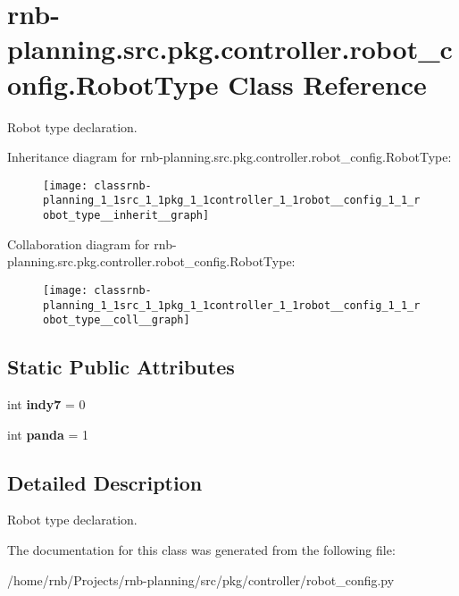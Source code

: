 \hypertarget{classrnb-planning_1_1src_1_1pkg_1_1controller_1_1robot__config_1_1_robot_type}{}\section{rnb-\/planning.src.\+pkg.\+controller.\+robot\+\_\+config.\+Robot\+Type Class Reference}
\label{classrnb-planning_1_1src_1_1pkg_1_1controller_1_1robot__config_1_1_robot_type}


Robot type declaration.  




Inheritance diagram for rnb-\/planning.src.\+pkg.\+controller.\+robot\+\_\+config.\+Robot\+Type\+:\nopagebreak
\begin{figure}[H]
\begin{center}
\leavevmode
\texttt{[image: classrnb-planning\_1\_1src\_1\_1pkg\_1\_1controller\_1\_1robot\_\_config\_1\_1\_robot\_type\_\_inherit\_\_graph]}
\end{center}
\end{figure}


Collaboration diagram for rnb-\/planning.src.\+pkg.\+controller.\+robot\+\_\+config.\+Robot\+Type\+:\nopagebreak
\begin{figure}[H]
\begin{center}
\leavevmode
\texttt{[image: classrnb-planning\_1\_1src\_1\_1pkg\_1\_1controller\_1\_1robot\_\_config\_1\_1\_robot\_type\_\_coll\_\_graph]}
\end{center}
\end{figure}
\subsection*{Static Public Attributes}
\begin{DoxyCompactItemize}
\item 
\mbox{\label{classrnb-planning_1_1src_1_1pkg_1_1controller_1_1robot__config_1_1_robot_type_a2ea99952cada8f9133c88c4d026a45aa}} 
int {\bfseries indy7} = 0
\item 
\mbox{\label{classrnb-planning_1_1src_1_1pkg_1_1controller_1_1robot__config_1_1_robot_type_a7579da07da0123ca88734411c241d786}} 
int {\bfseries panda} = 1
\end{DoxyCompactItemize}


\subsection{Detailed Description}
Robot type declaration. 

The documentation for this class was generated from the following file\+:\begin{DoxyCompactItemize}
\item 
/home/rnb/\+Projects/rnb-\/planning/src/pkg/controller/robot\+\_\+config.\+py\end{DoxyCompactItemize}
